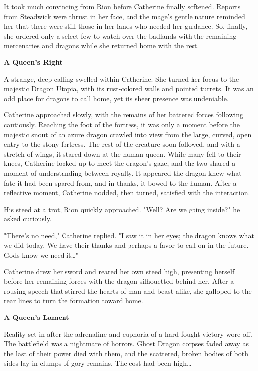 \begin{multicols*}{2}
It took much convincing from Rion before Catherine finally softened. Reports from Steadwick were thrust in her face, and the mage's gentle nature reminded her that there were still those in her lands who needed her guidance. So, finally, she ordered only a select few to watch over the badlands with the remaining mercenaries and dragons while she returned home with the rest.

\textbf{A Queen's Right}

A strange, deep calling swelled within Catherine. She turned her focus to the majestic Dragon Utopia, with its rust-colored walls and pointed turrets. It was an odd place for dragons to call home, yet its sheer presence was undeniable.

Catherine approached slowly, with the remains of her battered forces following cautiously. Reaching the foot of the fortress, it was only a moment before the majestic snout of an azure dragon crawled into view from the large, curved, open entry to the stony fortress. The rest of the creature soon followed, and with a stretch of wings, it stared down at the human queen. While many fell to their knees, Catherine looked up to meet the dragon's gaze, and the two shared a moment of understanding between royalty. It appeared the dragon knew what fate it had been spared from, and in thanks, it bowed to the human. After a reflective moment, Catherine nodded, then turned, satisfied with the interaction.

His steed at a trot, Rion quickly approached. "Well? Are we going inside?" he asked curiously.

"There's no need," Catherine replied. "I saw it in her eyes; the dragon knows what we did today. We have their thanks and perhaps a favor to call on in the future. Gods know we need it…"

Catherine drew her sword and reared her own steed high, presenting herself before her remaining forces with the dragon silhouetted behind her. After a rousing speech that stirred the hearts of man and beast alike, she galloped to the rear lines to turn the formation toward home.

\textbf{A Queen's Lament}

Reality set in after the adrenaline and euphoria of a hard-fought victory wore off. The battlefield was a nightmare of horrors. Ghost Dragon corpses faded away as the last of their power died with them, and the scattered, broken bodies of both sides lay in clumps of gory remains. The cost had been high…


\end{multicols*}
